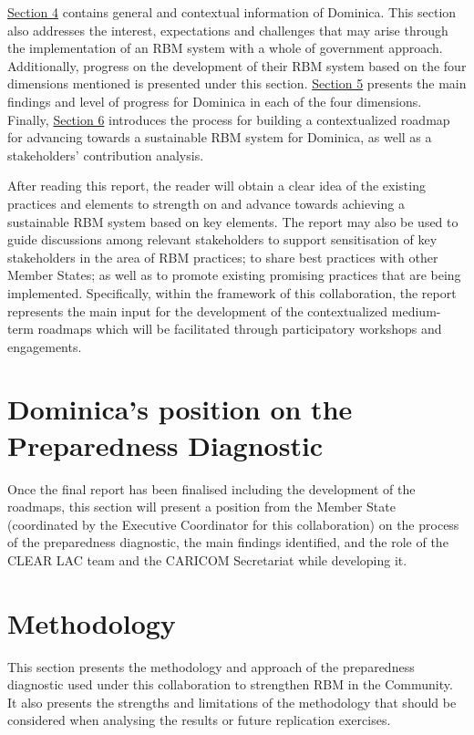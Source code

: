 \documentclass[
  10pt,
]{book}
\begin{document}
\protect\hyperlink{section4}{Section 4} contains general and contextual information of Dominica. This section also addresses the interest, expectations and challenges that may arise through the implementation of an RBM system with a whole of government approach. Additionally, progress on the development of their RBM system based on the four dimensions mentioned is presented under this section.
\protect\hyperlink{section5}{Section 5} presents the main findings and level of progress for Dominica in each of the four dimensions. Finally, \protect\hyperlink{section6}{Section 6} introduces the process for building a contextualized roadmap for advancing towards a sustainable RBM system for Dominica, as well as a stakeholders' contribution analysis.

After reading this report, the reader will obtain a clear idea of the existing practices and elements to strength on and advance towards achieving a sustainable RBM system based on key elements. The report may also be used to guide discussions among relevant stakeholders to support sensitisation of key stakeholders in the area of RBM practices; to share best practices with other Member States; as well as to promote existing promising practices that are being implemented.
Specifically, within the framework of this collaboration, the report represents the main input for the development of the contextualized medium-term roadmaps which will be facilitated through participatory workshops and engagements.

\hypertarget{section2}{%
\chapter{Dominica's position on the Preparedness Diagnostic}\label{section2}}

{ Once the final report has been finalised including the development of the roadmaps, this section will present a position from the Member State (coordinated by the Executive Coordinator for this collaboration) on the process of the preparedness diagnostic, the main findings identified, and the role of the CLEAR LAC team and the CARICOM Secretariat while developing it. }

\hypertarget{section3}{%
\chapter{Methodology}\label{section3}}

This section presents the methodology and approach of the preparedness diagnostic used under this collaboration to strengthen RBM in the Community. It also presents the strengths and limitations of the methodology that should be considered when analysing the results or future replication exercises.
\end{document}
